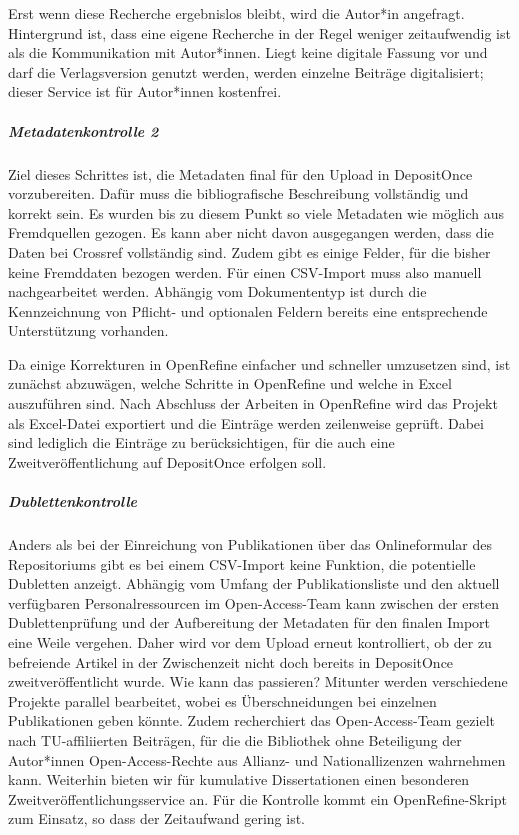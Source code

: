 \documentclass[a4paper,
fontsize=11pt,
oneside,
numbers=noperiodatend,
parskip=half-,
bibliography=totoc,
final
]{scrartcl}
\begin{document}
Erst wenn diese Recherche ergebnislos bleibt, wird die Autor*in
angefragt. Hintergrund ist, dass eine eigene Recherche in der Regel
weniger zeitaufwendig ist als die Kommunikation mit Autor*innen. Liegt
keine digitale Fassung vor und darf die Verlagsversion genutzt werden,
werden einzelne Beiträge digitalisiert; dieser Service ist für
Autor*innen kostenfrei.

\hypertarget{metadatenkontrolle-2}{%
\subparagraph{Metadatenkontrolle 2}\label{metadatenkontrolle-2}}

Ziel dieses Schrittes ist, die Metadaten final für den Upload in
DepositOnce vorzubereiten. Dafür muss die bibliografische Beschreibung
vollständig und korrekt sein. Es wurden bis zu diesem Punkt so viele
Metadaten wie möglich aus Fremdquellen gezogen. Es kann aber nicht davon
ausgegangen werden, dass die Daten bei Crossref vollständig sind. Zudem
gibt es einige Felder, für die bisher keine Fremddaten bezogen werden.
Für einen CSV-Import muss also manuell nachgearbeitet werden. Abhängig
vom Dokumententyp ist durch die Kennzeichnung von Pflicht- und
optionalen Feldern bereits eine entsprechende Unterstützung vorhanden.

Da einige Korrekturen in OpenRefine einfacher und schneller umzusetzen
sind, ist zunächst abzuwägen, welche Schritte in OpenRefine und welche
in Excel auszuführen sind. Nach Abschluss der Arbeiten in OpenRefine
wird das Projekt als Excel-Datei exportiert und die Einträge werden
zeilenweise geprüft. Dabei sind lediglich die Einträge zu
berücksichtigen, für die auch eine Zweitveröffentlichung auf DepositOnce
erfolgen soll.

\hypertarget{dublettenkontrolle}{%
\subparagraph{Dublettenkontrolle}\label{dublettenkontrolle}}

Anders als bei der Einreichung von Publikationen über das Onlineformular
des Repositoriums gibt es bei einem CSV-Import keine Funktion, die
potentielle Dubletten anzeigt. Abhängig vom Umfang der Publikationsliste
und den aktuell verfügbaren Personalressourcen im Open-Access-Team kann
zwischen der ersten Dublettenprüfung und der Aufbereitung der Metadaten
für den finalen Import eine Weile vergehen. Daher wird vor dem Upload
erneut kontrolliert, ob der zu befreiende Artikel in der Zwischenzeit
nicht doch bereits in DepositOnce zweitveröffentlicht wurde. Wie kann
das passieren? Mitunter werden verschiedene Projekte parallel
bearbeitet, wobei es Überschneidungen bei einzelnen Publikationen geben
könnte. Zudem recherchiert das Open-Access-Team gezielt nach
TU-affiliierten Beiträgen, für die die Bibliothek ohne Beteiligung der
Autor*innen Open-Access-Rechte aus Allianz- und Nationallizenzen
wahrnehmen kann. Weiterhin bieten wir für kumulative Dissertationen
einen besonderen Zweitveröffentlichungsservice an. Für die Kontrolle
kommt ein OpenRefine-Skript zum Einsatz, so dass der Zeitaufwand gering
ist.
\end{document}
